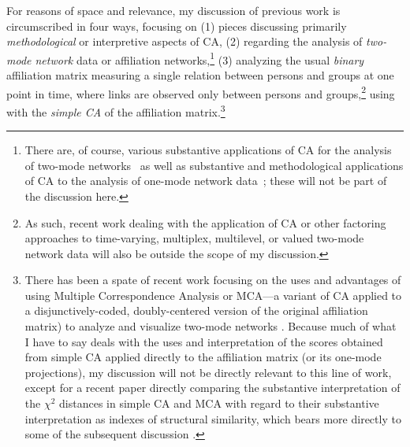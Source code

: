 \documentclass[a4paper,fleqn]{cas-sc}
\begin{document}
For reasons of space and relevance, my discussion of previous work is circumscribed in four ways, focusing on (1) pieces discussing primarily \textit{methodological} or interpretive aspects of CA, (2) regarding the analysis of \textit{two-mode network} data or affiliation networks,\footnote{There are, of course, various substantive applications of CA for the analysis of two-mode networks~\citep[e.g.,][]{breiger2000tool, faust2002scaling, schweizer1991power, serino2024mapping, ragozini2018analysis} as well as substantive and methodological applications of CA to the analysis of one-mode network data~\citep[e.g.,][]{noma1985scaling, kumbasar1994systematic, lizardo2020correspondence}; these will not be part of the discussion here.} (3) analyzing the usual \textit{binary} affiliation matrix measuring a single relation between persons and groups at one point in time, where links are observed only between persons and groups,\footnote{As such, recent work dealing with the application of CA or other factoring approaches to time-varying, multiplex, multilevel, or valued two-mode network data \citep{ragozini2014correspondence, ragozini2015multiple, zhu2016correspondence} will also be outside the scope of my discussion.} using with the \textit{simple CA} of the affiliation matrix.\footnote{There has been a spate of recent work focusing on the uses and advantages of using Multiple Correspondence Analysis or MCA---a variant of CA applied to a disjunctively-coded, doubly-centered version of the original affiliation matrix) to analyze and visualize two-mode networks \citep[e.g.,][]{dramalidis2016subset, desposito2014use, ragozini2014correspondence}. Because much of what I have to say deals with the uses and interpretation of the scores obtained from simple CA applied directly to the affiliation matrix (or its one-mode projections), my discussion will not be directly relevant to this line of work, except for a recent paper directly comparing the substantive interpretation of the $\chi^2$ distances in simple CA and MCA with regard to their substantive interpretation as indexes of structural similarity, which bears more directly to some of the subsequent discussion \citep{desposito2014comparison}.}

\end{document}
